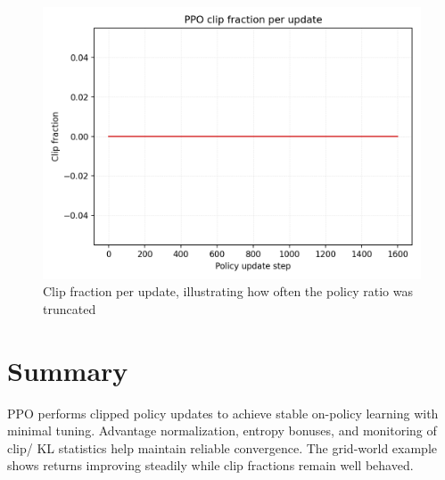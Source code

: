 ﻿\documentclass[12pt]{article}
\begin{document}
\begin{figure}[H]
  \centering
  \includegraphics[width=0.82\linewidth]{ppo_clip_stats.png}
  \caption{Clip fraction per update, illustrating how often the policy ratio was truncated}
  \label{fig:ppo_clip_stats}
\end{figure}

\FloatBarrier
\section{Summary}
PPO performs clipped policy updates to achieve stable on-policy learning with minimal tuning. Advantage normalization, entropy bonuses, and monitoring of clip/ KL statistics help maintain reliable convergence. The grid-world example shows returns improving steadily while clip fractions remain well behaved.
\end{document}
